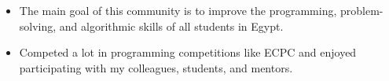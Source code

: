 





\begin{itemize}
    \item The main goal of this community is to improve the programming, problem-solving, and algorithmic skills of all students in Egypt.
    \item Competed a lot in programming competitions like ECPC and enjoyed participating with my colleagues, students, and mentors.
\end{itemize}




